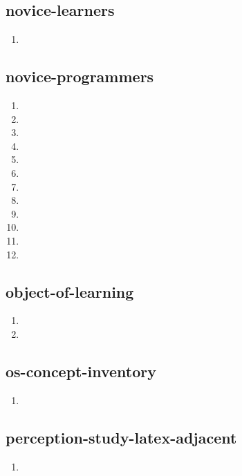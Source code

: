 \documentclass{article}
\begin{document}
\subsection{novice-learners}
\begin{enumerate}
\item {}
\end{enumerate}

\subsection{novice-programmers}
\begin{enumerate}
\item {}
\item {}
\item {}
\item {}
\item {}
\item {}
\item {}
\item {}
\item {}
\item {}
\item {}
\item {}
\end{enumerate}

\subsection{object-of-learning}
\begin{enumerate}
\item {}
\item {}
\end{enumerate}

\subsection{os-concept-inventory}
\begin{enumerate}
\item {}
\end{enumerate}

\subsection{perception-study-latex-adjacent}
\begin{enumerate}
\item {}
\end{enumerate}
\end{document}

